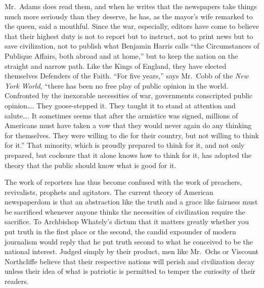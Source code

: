 \documentclass[openany,nobib,twoside,nohyper]{tufte-book}
\begin{document}
Mr.~Adams does read them, and when he writes that the newspapers take
things much more seriously than they deserve, he has, as the mayor's
wife remarked to the queen, said a mouthful. Since the war, especially,
editors have come to believe that their highest duty is not to report
but to instruct, not to print news but to save civilization, not to
publish what Benjamin Harris calls ``the Circumstances of Publique
Affairs, both abroad and at home,'' but to keep the nation on the
straight and narrow path. Like the Kings of England, they have elected
themselves Defenders of the Faith. ``For five years,'' says Mr.~Cobb of
the \emph{New York World}, ``there has been no free play of public
opinion in the world. Confronted by the inexorable necessities of war,
governments conscripted public opinion\ldots. They goose-stepped it.
They taught it to stand at attention and salute\ldots. It sometimes
seems that after the armistice was signed, millions of Americans must
have taken a vow that they would never again do any thinking for
themselves. They were willing to die for their country, but not willing
to think for it.'' That minority, which is proudly prepared to think for
it, and not only prepared, but cocksure that it alone knows how to think
for it, has adopted the theory that the public should know what is good
for it.

The work of reporters has thus become confused with the work of
preachers, revivalists, prophets and agitators. The current theory of
American newspaperdom is that an abstraction like the truth and a grace
like fairness must be sacrificed whenever anyone thinks the necessities
of civilization require the sacrifice. To Archbishop Whately's dictum
that it matters greatly whether you put truth in the first place or the
second, the candid expounder of modern journalism would reply that he
put truth second to what he conceived to be the national interest.
Judged simply by their product, men like Mr.~Ochs or Viscount
Northcliffe believe that their respective nations will perish and
civilization decay unless their idea of what is patriotic is permitted
to temper the curiosity of their readers.
\end{document}
